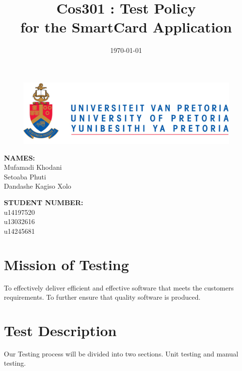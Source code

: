\documentclass[english]{article}
\title{Cos301 : Test Policy\\
	for the SmartCard Application\\
}
\date{\today}
\begin{document}
	\maketitle
	\begin{figure}[!t]
		\includegraphics{up_logo.png}
	\end{figure}
	\begin{minipage}{0.4\textwidth}
		\begin{flushleft} \large
			\textbf{NAMES:}\\[0.4cm]
			Mufamadi {Khodani} \\
			Setoaba {Phuti} \\
			Dandashe {Kagiso Xolo} \\
			
		\end{flushleft}
	\end{minipage}
	\begin{minipage}{0.4\textwidth}
		\begin{flushright} \large
			\textbf{STUDENT NUMBER:} \\[0.4cm]
			u14197520 \\
			u13032616 \\
			u14245681 \\
		\end{flushright}
	\end{minipage}
	
	
	\newpage
	
	\tableofcontents
	
	
	
	\newpage

	


	

	\section{Mission of Testing}
	To effectively deliver efficient and effective software that meets the customers requirements. To further ensure that quality software is produced.  


	\section{Test Description}
	Our Testing process will be divided into two sections. Unit testing and manual testing. 
\end{document}
